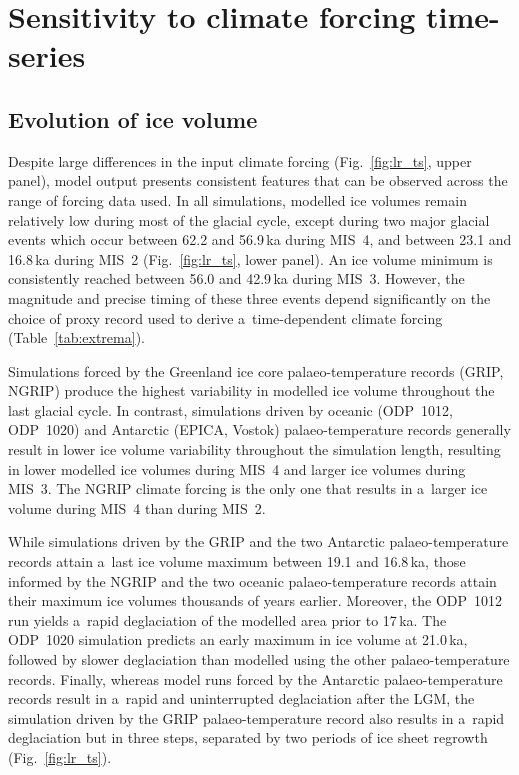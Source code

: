 \documentclass[tc, manuscript]{copernicus}
\begin{document}
\section{Sensitivity to climate forcing time-series}
\label{sec:results}

\subsection{Evolution of ice volume}

      Despite large differences in the input climate forcing
      (Fig.~\ref{fig:lr_ts}, upper panel), model output presents consistent
      features that can be observed across the range of forcing data used.
      In all simulations, modelled ice volumes remain relatively low during
      most of the glacial cycle, except during two major glacial events
      which occur between 62.2 and 56.9\,\unit{ka} during MIS~4, and between
      23.1 and 16.8\,\unit{ka} during MIS~2 (Fig.~\ref{fig:lr_ts}, lower
      panel). An ice volume minimum is consistently reached between 56.0 and
      42.9\,\unit{ka} during MIS~3. However, the magnitude and precise
      timing of these three events depend significantly on the choice of
      proxy record used to derive a~time-dependent climate forcing
      (Table~\ref{tab:extrema}).

      Simulations forced by the Greenland ice core palaeo-temperature
      records (GRIP, NGRIP) produce the highest variability in modelled ice
      volume throughout the last glacial cycle. In contrast, simulations
      driven by oceanic (ODP~1012, ODP~1020) and Antarctic (EPICA, Vostok)
      palaeo-temperature records generally result in lower ice volume
      variability throughout the simulation length, resulting in lower
      modelled ice volumes during MIS~4 and larger ice volumes during MIS~3.
      The NGRIP climate forcing is the only one that results in a~larger ice
      volume during MIS~4 than during MIS~2.

      While simulations driven by the GRIP and the two Antarctic
      palaeo-temperature records attain a~last ice volume maximum between
      19.1 and 16.8\,\unit{ka}, those informed by the NGRIP and the two
      oceanic palaeo-temperature records attain their maximum ice volumes
      thousands of years earlier. Moreover, the ODP~1012 run yields a~rapid
      deglaciation of the modelled area prior to 17\,\unit{ka}. The ODP~1020
      simulation predicts an early maximum in ice volume at 21.0\,\unit{ka},
      followed by slower deglaciation than modelled using the other
      palaeo-temperature records. Finally, whereas model runs forced by the
      Antarctic palaeo-temperature records result in a~rapid and
      uninterrupted deglaciation after the LGM, the simulation driven by the
      GRIP palaeo-temperature record also results in a~rapid deglaciation
      but in three steps, separated by two periods of ice sheet regrowth
      (Fig.~\ref{fig:lr_ts}).
\end{document}
